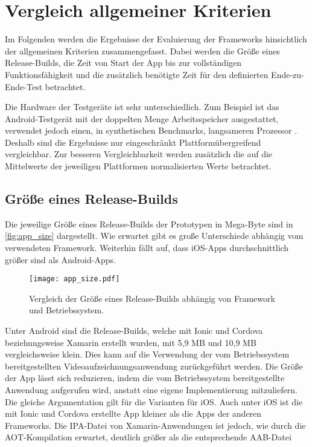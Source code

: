 \section{Vergleich allgemeiner Kriterien}
\label{sec:evaluation_allgemein}

Im Folgenden werden die Ergebnisse der Evaluierung der Frameworks hinsichtlich der allgemeinen Kriterien zusammengefasst.
Dabei werden die Größe eines Release-Builds, die Zeit von Start der App bis zur vollständigen Funktionsfähigkeit und die zusätzlich benötigte Zeit für den definierten Ende-zu-Ende-Test betrachtet.

Die Hardware der Testgeräte ist sehr unterschiedlich.
Zum Beispiel ist das Android-Testgerät mit der doppelten Menge Arbeitsspeicher ausgestattet, verwendet jedoch einen, in synthetischen Benchmarks, langsameren Prozessor \cite{Comparison_Phones}.
Deshalb sind die Ergebnisse nur eingeschränkt Plattformübergreifend vergleichbar.
Zur besseren Vergleichbarkeit werden zusätzlich die auf die Mittelwerte der jeweiligen Plattformen normalisierten Werte betrachtet.


\subsection{Größe eines Release-Builds}

Die jeweilige Größe eines Release-Builds der Prototypen in Mega-Byte sind in \autoref{fig:app_size} dargestellt.
Wie erwartet gibt es große Unterschiede abhängig vom verwendeten Framework.
Weiterhin fällt auf, dass iOS-Apps durchschnittlich größer sind als Android-Apps.
\begin{figure}[ht]
  \centering 
  \texttt{[image: app\_size.pdf]}
  \caption{Vergleich der Größe eines Release-Builds abhängig von Framework und Betriebssystem.}
  \label{fig:app_size}
\end{figure}

Unter Android sind die Release-Builds, welche mit Ionic und Cordova beziehungsweise Xamarin erstellt wurden, mit 5,9 MB und 10,9 MB vergleichsweise klein.
Dies kann auf die Verwendung der vom Betriebssystem bereitgestellten Videoaufzeichnungsanwendung zurückgeführt werden.
Die Größe der App lässt sich reduzieren, indem die vom Betriebssystem bereitgestellte Anwendung aufgerufen wird, anstatt eine eigene Implementierung mitzuliefern.
Die gleiche Argumentation gilt für die Varianten für iOS.
Auch unter iOS ist die mit Ionic und Cordova erstellte App kleiner als die Apps der anderen Frameworks.
Die \ac{IPA}-Datei von Xamarin-Anwendungen ist jedoch, wie durch die \ac{AOT}-Kompilation erwartet, deutlich größer als die entsprechende \ac{AAB}-Datei


